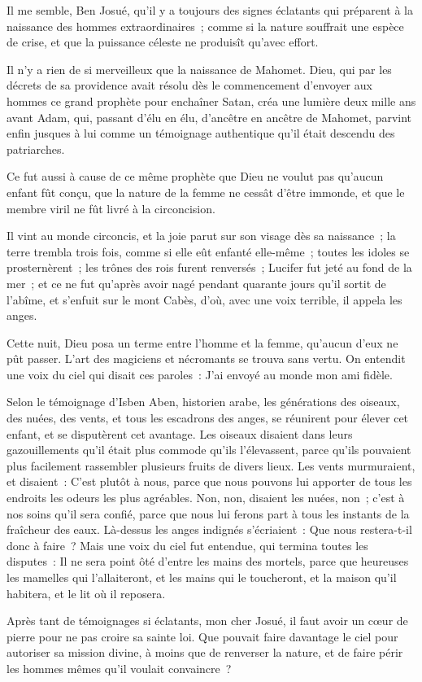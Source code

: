 \documentclass[french,twoside]{book} %
\begin{document}
\noindent Il me semble, Ben Josué, qu’il y a toujours des signes éclatants qui préparent à la naissance des hommes extraordinaires ; comme si la nature souffrait une espèce de crise, et que la puissance céleste ne produisît qu’avec effort.\par
Il n’y a rien de si merveilleux que la naissance de Mahomet. Dieu, qui par les décrets de sa providence avait résolu dès le commencement d’envoyer aux hommes ce grand prophète pour enchaîner Satan, créa une lumière deux mille ans avant Adam, qui, passant d’élu en élu, d’ancêtre en ancêtre de Mahomet, parvint enfin jusques à lui comme un témoignage authentique qu’il était descendu des patriarches.\par
Ce fut aussi à cause de ce même prophète que Dieu ne voulut pas qu’aucun enfant fût conçu, que la nature de la femme ne cessât d’être immonde, et que le membre viril ne fût livré à la circoncision.\par
Il vint au monde circoncis, et la joie parut sur son visage dès sa naissance ; la terre trembla trois fois, comme si elle eût enfanté elle-même ; toutes les idoles se prosternèrent ; les trônes des rois furent renversés ; Lucifer fut jeté au fond de la mer ; et ce ne fut qu’après avoir nagé pendant quarante jours qu’il sortit de l’abîme, et s’enfuit sur le mont Cabès, d’où, avec une voix terrible, il appela les anges.\par
Cette nuit, Dieu posa un terme entre l’homme et la femme, qu’aucun d’eux ne pût passer. L’art des magiciens et nécromants se trouva sans vertu. On entendit une voix du ciel qui disait ces paroles : J’ai envoyé au monde mon ami fidèle.\par
Selon le témoignage d’Isben Aben, historien arabe, les générations des oiseaux, des nuées, des vents, et tous les escadrons des anges, se réunirent pour élever cet enfant, et se disputèrent cet avantage. Les oiseaux disaient dans leurs gazouillements qu’il était plus commode qu’ils l’élevassent, parce qu’ils pouvaient plus facilement rassembler plusieurs fruits de divers lieux. Les vents murmuraient, et disaient : C’est plutôt à nous, parce que nous pouvons lui apporter de tous les endroits les odeurs les plus agréables. Non, non, disaient les nuées, non ; c’est à nos soins qu’il sera confié, parce que nous lui ferons part à tous les instants de la fraîcheur des eaux. Là-dessus les anges indignés s’écriaient : Que nous restera-t-il donc à faire ? Mais une voix du ciel fut entendue, qui termina toutes les disputes : Il ne sera point ôté d’entre les mains des mortels, parce que heureuses les mamelles qui l’allaiteront, et les mains qui le toucheront, et la maison qu’il habitera, et le lit où il reposera.\par
Après tant de témoignages si éclatants, mon cher Josué, il faut avoir un cœur de pierre pour ne pas croire sa sainte loi. Que pouvait faire davantage le ciel pour autoriser sa mission divine, à moins que de renverser la nature, et de faire périr les hommes mêmes qu’il voulait convaincre ?\par
\end{document}

